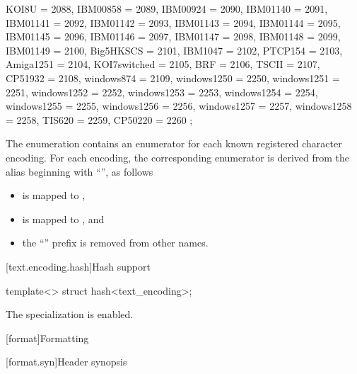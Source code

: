 \begin{codeblock}
{{    KOI8U = 2088,
    IBM00858 = 2089,
    IBM00924 = 2090,
    IBM01140 = 2091,
    IBM01141 = 2092,
    IBM01142 = 2093,
    IBM01143 = 2094,
    IBM01144 = 2095,
    IBM01145 = 2096,
    IBM01146 = 2097,
    IBM01147 = 2098,
    IBM01148 = 2099,
    IBM01149 = 2100,
    Big5HKSCS = 2101,
    IBM1047 = 2102,
    PTCP154 = 2103,
    Amiga1251 = 2104,
    KOI7switched = 2105,
    BRF = 2106,
    TSCII = 2107,
    CP51932 = 2108,
    windows874 = 2109,
    windows1250 = 2250,
    windows1251 = 2251,
    windows1252 = 2252,
    windows1253 = 2253,
    windows1254 = 2254,
    windows1255 = 2255,
    windows1256 = 2256,
    windows1257 = 2257,
    windows1258 = 2258,
    TIS620 = 2259,
    CP50220 = 2260
  };
}
\end{codeblock}

\begin{note}
The  enumeration
contains an enumerator for each known registered character encoding.
For each encoding, the corresponding enumerator is derived from
the alias beginning with ``'', as follows
\begin{itemize}
\item
{} is mapped to ,
\item
{} is mapped to , and
\item
the ``'' prefix is removed from other names.
\end{itemize}
\end{note}

[text.encoding.hash]{Hash support}

%
\begin{itemdecl}
template<> struct hash<text_encoding>;
\end{itemdecl}

\begin{itemdescr}
\pnum
The specialization is enabled.
\end{itemdescr}

[format]{Formatting}

[format.syn]{Header  synopsis}

